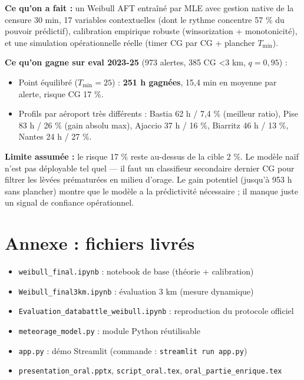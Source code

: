 \documentclass[11pt,a4paper]{article}
\begin{document}
\begin{tcolorbox}[colback=green!5,colframe=green!60!black,title=\textbf{En résumé}]
\textbf{Ce qu'on a fait :} un Weibull AFT entraîné par MLE avec gestion native de la censure
30 min, 17 variables contextuelles (dont le rythme concentre 57 \% du pouvoir prédictif),
calibration empirique robuste (winsorization + monotonicité), et une simulation opérationnelle
réelle (timer CG par CG + plancher $T_{\min}$).

\medskip

\textbf{Ce qu'on gagne sur eval 2023-25} (973 alertes, 385 CG <3 km, $q = 0{,}95$) :
\begin{itemize}[topsep=2pt]
    \item Point équilibré ($T_{\min} = 25$) : \textbf{251 h gagnées}, 15,4 min en moyenne par
    alerte, risque CG 17 \%.
    \item Profils par aéroport très différents : Bastia 62 h / 7,4 \% (meilleur ratio), Pise
    83 h / 26 \% (gain absolu max), Ajaccio 37 h / 16 \%, Biarritz 46 h / 13 \%, Nantes
    24 h / 27 \%.
\end{itemize}

\medskip

\textbf{Limite assumée :} le risque 17 \% reste au-dessus de la cible 2 \%. Le modèle naïf
n'est pas déployable tel quel — il faut un classifieur secondaire \og dernier CG \fg{} pour
filtrer les lèvées prématurées en milieu d'orage. Le gain potentiel (jusqu'à 953 h sans
plancher) montre que le modèle a la prédictivité nécessaire ; il manque juste un signal de
confiance opérationnel.
\end{tcolorbox}

\appendix
\section{Annexe : fichiers livrés}
\begin{itemize}[topsep=2pt]
    \item \texttt{weibull\_final.ipynb} : notebook de base (théorie + calibration)
    \item \texttt{Weibull\_final3km.ipynb} : évaluation 3 km (mesure dynamique)
    \item \texttt{Evaluation\_databattle\_weibull.ipynb} : reproduction du protocole officiel
    \item \texttt{meteorage\_model.py} : module Python réutilisable
    \item \texttt{app.py} : démo Streamlit (commande : \texttt{streamlit run app.py})
    \item \texttt{presentation\_oral.pptx}, \texttt{script\_oral.tex}, \texttt{oral\_partie\_enrique.tex}
\end{itemize}
\end{document}
